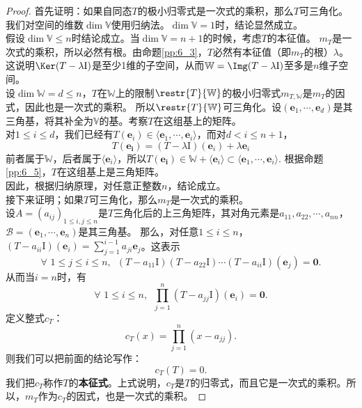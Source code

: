 \documentclass[12pt,UTF8]{ctexbook}
\begin{document}
\begin{proof} %
    首先证明：如果自同态$T$的极小归零式是一次式的乘积，那么$T$可三角化。\\
    我们对空间的维数$\dim \mathbb{V}$使用归纳法。$\dim \mathbb{V} = 1$时，结论显然成立。\\
    假设$\dim \mathbb{V} \leqslant n$时结论成立。当$\dim \mathbb{V} = n+1$的时候，考虑$T$的本征值。
    $m_T$是一次式的乘积，所以必然有根。由命题\ref{pp:6_3}，$T$必然有本征值（即$m_T$的根）$\lambda$。
    这说明$\Ker (T - \lambda\mathrm{I})$是至少1维的子空间，从而$\mathbb{W} = \Img (T - \lambda\mathrm{I})$至多是$n$维子空间。\\
    设$\dim \mathbb{W} = d \leqslant n$，$T$在$\mathbb{W}$上的限制$\restr{T}{\mathbb{W}}$的极小归零式$m_{T,\mathbb{W}}$是$m_T$的因式，因此也是一次式的乘积。
    所以$\restr{T}{\mathbb{W}}$可三角化。设$(\mathbf{e}_1, \cdots, \mathbf{e}_d)$是其三角基，将其补全为$\mathbb{V}$的基。考察$T$在这组基上的矩阵。\\
    对$1 \leqslant i \leqslant d$，我们已经有$T(\mathbf{e}_i) \in \langle \mathbf{e}_1, \cdots, \mathbf{e}_i\rangle$，而对$d < i \leqslant n+1$，
    $$T(\mathbf{e_i}) = (T - \lambda\mathrm{I})(\mathbf{e}_i) + \lambda \mathbf{e}_i$$
    前者属于$\mathbb{W}$，后者属于$\langle \mathbf{e}_i\rangle$，所以$T(\mathbf{e_i}) \in \mathbb{W}+\langle \mathbf{e}_i\rangle \subset  \langle \mathbf{e}_1, \cdots, \mathbf{e}_i\rangle.$
    根据命题\ref{pp:6_5}，$T$在这组基上是三角矩阵。\\
    因此，根据归纳原理，对任意正整数$n$，结论成立。\\
    接下来证明；如果$T$可三角化，那么$m_T$是一次式的乘积。\\
    设$A = (a_{ij})_{1\leqslant i, j\leqslant n}$是$T$三角化后的上三角矩阵，其对角元素是$a_{11}, a_{22}, \cdots, a_{nn}$，
    $\mathcal{B} = (\mathbf{e}_1, \cdots, \mathbf{e}_n)$是其三角基。
    那么，对任意$1\leqslant i \leqslant n$，$(T - a_{ii}\mathrm{I})(\mathbf{e}_i) = \sum_{j=1}^{i-1}a_{ji}\mathbf{e}_j$。这表示
    $$ \forall \,\,1\leqslant j \leqslant i \leqslant n, \,\,\, (T - a_{11}\mathrm{I})(T - a_{22}\mathrm{I})\cdots(T - a_{ii}\mathrm{I})(\mathbf{e}_j) = \mathbf{0}. $$
    从而当$i=n$时，有
    $$\forall \,\,1\leqslant i \leqslant n, \,\,\, \prod_{j=1}^n(T - a_{jj}\mathrm{I})(\mathbf{e}_i) = \mathbf{0}.$$
    定义整式$c_T$：
    $$
    c_T(x) = \prod_{j=1}^n(x - a_{jj}).
    $$
    则我们可以把前面的结论写作：
    $$
    c_T(T) = 0.
    $$
    我们把$c_T$称作$T$的\textbf{本征式}。上式说明，$c_T$是$T$的归零式，而且它是一次式的乘积。所以，$m_T$作为$c_T$的因式，也是一次式的乘积。 

\end{proof}
\end{document}
